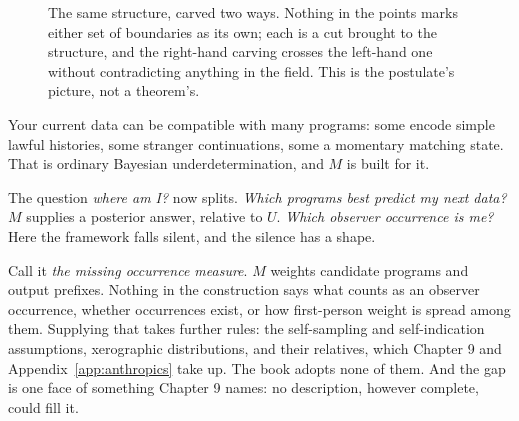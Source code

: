 \begin{figure}[h]
\centering
{}
\caption{The same structure, carved two ways. Nothing in the points marks either set of boundaries as its own; each is a cut brought to the structure, and the right-hand carving crosses the left-hand one without contradicting anything in the field. This is the postulate's picture, not a theorem's.}
\label{fig:two-carvings}
\end{figure}

Your current data can be compatible with many programs: some encode simple lawful histories, some stranger continuations, some a momentary matching state. That is ordinary Bayesian underdetermination, and $M$ is built for it.

The question \emph{where am I?} now splits. \emph{Which programs best predict my next data?} $M$ supplies a posterior answer, relative to $U$. \emph{Which observer occurrence is me?} Here the framework falls silent, and the silence has a shape.

Call it \emph{the missing occurrence measure}. $M$ weights candidate programs and output prefixes. Nothing in the construction says what counts as an observer occurrence, whether occurrences exist, or how first-person weight is spread among them. Supplying that takes further rules: the self-sampling and self-indication assumptions, xerographic distributions, and their relatives, which Chapter 9 and Appendix~\ref{app:anthropics} take up. The book adopts none of them. And the gap is one face of something Chapter 9 names: no description, however complete, could fill it.

